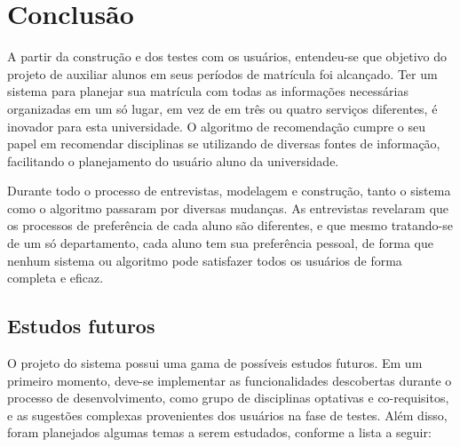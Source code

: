 \chapter{Conclusão}
\label{cha:Conclusão}

A partir da construção e dos testes com os usuários, entendeu-se que objetivo do projeto de auxiliar alunos em seus períodos de matrícula foi alcançado.
Ter um sistema para planejar sua matrícula com todas as informações necessárias organizadas em um só lugar, em vez de em três ou quatro serviços diferentes, é inovador
para esta universidade. O algoritmo de recomendação cumpre o seu papel em recomendar disciplinas se utilizando de diversas fontes de informação, facilitando
o planejamento do usuário aluno da universidade.

Durante todo o processo de entrevistas, modelagem e construção, tanto o sistema como o algoritmo passaram por diversas mudanças. As entrevistas revelaram que os
processos de preferência de cada aluno são diferentes, e que mesmo tratando-se de um só departamento, cada aluno tem sua preferência pessoal, de forma que nenhum
sistema ou algoritmo pode satisfazer todos os usuários de forma completa e eficaz.

\section{Estudos futuros}

O projeto do sistema possui uma gama de possíveis estudos futuros. Em um primeiro momento, deve-se implementar as funcionalidades descobertas durante o processo de desenvolvimento, como grupo de disciplinas optativas e co-requisitos, e as sugestões complexas provenientes dos usuários na fase de testes. Além disso, foram planejados algumas temas a serem estudados, conforme a lista a seguir:



